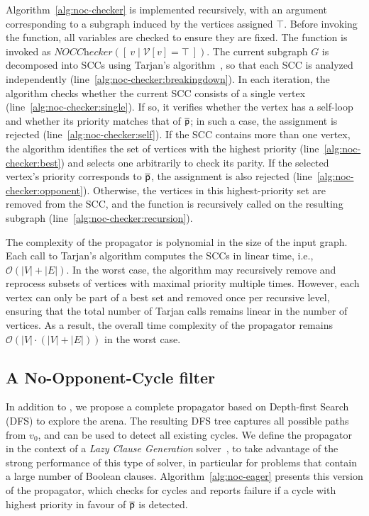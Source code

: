 \documentclass[letterpaper]{article} %
\begin{document}
Algorithm~\ref{alg:noc-checker} is implemented recursively, with an argument corresponding to a subgraph induced by the vertices assigned $\top$. Before invoking the function, all variables are checked to ensure they are fixed. The function is invoked as $\textit{NOCChecker}([\ { v \mid \mathcal{V}[v] = \top }\ ])$. The current subgraph $G$ is decomposed into SCCs using Tarjan’s algorithm~\cite{Tarjan:1972}, so that each SCC is analyzed independently (line~\ref{alg:noc-checker:breakingdown}).
%
In each iteration, the algorithm checks whether the current SCC consists of a single vertex (line~\ref{alg:noc-checker:single}). If so, it verifies whether the vertex has a self-loop and whether its priority matches that of $\opponent$; in such a case, the assignment is rejected (line~\ref{alg:noc-checker:self}).
%
If the SCC contains more than one vertex, the algorithm identifies the set of vertices with the highest priority (line~\ref{alg:noc-checker:best}) and selects one arbitrarily to check its parity. If the selected vertex’s priority corresponds to $\opponent$, the assignment is also rejected (line~\ref{alg:noc-checker:opponent}). Otherwise, the vertices in this highest-priority set are removed from the SCC, and the function is recursively called on the resulting subgraph (line~\ref{alg:noc-checker:recursion}).

The complexity of the \nocchecker propagator is polynomial in the size of the input graph. Each call to Tarjan's algorithm computes the SCCs in linear time, i.e., $\mathcal{O}(|V| + |E|)$. In the worst case, the algorithm may recursively remove and reprocess subsets of vertices with maximal priority multiple times. However, each vertex can only be part of a best set and removed once per recursive level, ensuring that the total number of Tarjan calls remains linear in the number of vertices. As a result, the overall time complexity of the propagator remains $\mathcal{O}(|V| \cdot (|V| + |E|))$ in the worst case.

\subsection{A No-Opponent-Cycle filter} \label{sec:nocfilter}
In addition to \nocchecker, we propose a complete propagator based on Depth-first Search (DFS) to explore the arena. The resulting DFS tree captures all possible paths from $v_0$, and can be used to detect all existing cycles. We define the propagator in the context of a \textit{Lazy Clause Generation} solver~\cite{DBLP:journals/constraints/OhrimenkoSC09}, to take advantage of the strong performance of this type of solver, in particular for problems that contain a large number of Boolean clauses. Algorithm~\ref{alg:noc-eager} presents this version of the propagator, which checks for cycles and reports failure if a cycle with highest priority in favour of $\opponent$ is detected.
\end{document}
